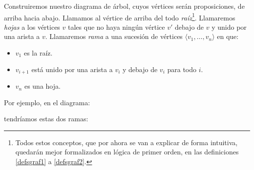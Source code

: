 Construiremos nuestro diagrama de árbol, cuyos vértices serán proposiciones, de arriba hacia abajo. Llamamos al vértice de arriba del todo \textit{raíz}\footnote{Todos estos conceptos, que por ahora se van a explicar de forma intuitiva, quedarán mejor formalizados en lógica de primer orden, en las definiciones \ref{defsgraf1} a \ref{defsgraf2}.}. Llamaremos \textit{hojas} a los vértices $v$ tales que no haya ningún vértice $v'$ debajo de $v$ y unido por una arista a $v$. Llamaremos \textit{rama} a una sucesión de vértices 
$\langle v_1, \dots, v_n\rangle$ en que:
\begin{itemize}
    \item $v_1$ es la raíz.
    \item $v_{i+1}$ está unido por una arista a $v_i$ y debajo de $v_i$ para todo $i$.
    \item $v_n$ es una hoja.
\end{itemize}
 Por ejemplo, en el diagrama:
\begin{center}
\end{center}
tendríamos estas dos ramas:
\begin{center}
\end{center}





